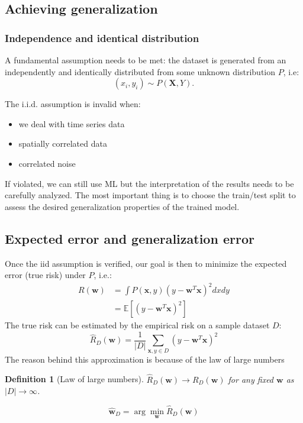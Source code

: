 \documentclass[a4paper,10pt,twoside]{article}
\newtheorem{definition}{Definition}[section]
\begin{document}
\subsection{Achieving generalization}
\subsubsection{Independence and identical distribution}
A fundamental assumption needs to be met: the dataset is generated from an independently and identically distributed from some unknown distribution $P$, i.e:
\begin{equation*}
    (x_i, y_i)\sim P(\mathbf{X},Y).
\end{equation*}

The i.i.d. assumption is invalid when:
\begin{itemize}
    \item we deal with time series data
    \item spatially correlated data
    \item correlated noise
\end{itemize}
If violated, we can still use ML but the interpretation of the results needs to be carefully analyzed. The most important thing is to choose the train/test split to assess the desired generalization properties of the trained model.

\subsection{Expected error and generalization error}
Once the iid assumption is verified, our goal is then to minimize the expected error (true risk) under $P$, i.e.:
\begin{align*}
    R(\mathbf{w})&=\int P(\mathbf{x},y)(y-\mathbf{w}^T\mathbf{x})^2dxdy\\
    & =\mathbb{E}[(y-\mathbf{w}^T\mathbf{x})^2]
\end{align*}
The true risk can be estimated by the empirical risk on a sample dataset $D$:
\begin{equation*}
    \hat{R}_D(\mathbf{w})=\frac{1}{|D|}\sum_{\mathbf{x}, y\in D}(y-\mathbf{w}^T\mathbf{x})^2
\end{equation*}
The reason behind this approximation is because of the law of large numbers
\begin{definition}[Law of large numbers]
    $\hat{R}_D(\mathbf{w})\rightarrow R_D(\mathbf{w})$ for any fixed $\mathbf{w}$ as $|D|\rightarrow\infty$.
\end{definition}
\begin{equation}
    \label{empirical_risk}
    \mathbf{\hat{w}}_D=\arg\min_{\mathbf{w}}\hat{R}_D(\mathbf{w})
\end{equation}
\end{document}
